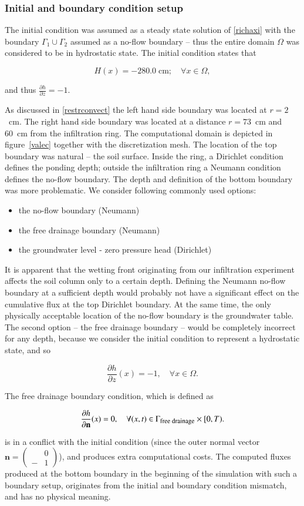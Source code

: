 \documentclass[review,times,3p,twocolumn,10pt]{elsarticle}
\newenvironment{lineq}
    {\begin{linenomath*}
    \begin{equation}
    }
    { 
    \end{equation} 
    \end{linenomath*}
    }
\renewcommand{\vec}{\mathbf}
\begin{document}
\subsubsection{Initial and boundary condition setup}



The initial condition was assumed as a steady state  solution  of \eqref{richaxi} with the boundary $\Gamma_1 \cup \Gamma_2$ assumed as a no-flow boundary -- thus the entire domain $\Omega$ was considered to be in hydrostatic state. The initial condition states that 
\begin{lineq}
	H(x) = -280.0 \; \mbox{cm}; \quad \forall x \in \Omega,
\end{lineq}
and thus $\frac{\partial h}{\partial z} = -1$.

As discussed in \ref{restrconvect} the left hand side boundary was located at $r=2$~cm. The right hand side boundary was located at a distance $r=73$~cm and 60~cm from the infiltration ring. The computational domain is depicted in figure~\ref{valec} together with the discretization mesh. The location of the top boundary was natural -- the soil surface. Inside the ring, a Dirichlet condition defines the ponding depth; outside the infiltration ring a Neumann condition defines the no-flow boundary. The depth and definition of the bottom boundary was more problematic. We consider following commonly used options:
\begin{itemize}
\item the no-flow boundary (Neumann)
\item the free drainage boundary (Neumann)
\item the groundwater level - zero pressure head (Dirichlet)
\end{itemize}
It is apparent that the wetting front originating from our infiltration experiment affects the soil column only to a certain depth. Defining the Neumann no-flow boundary at a sufficient depth would probably not have a significant effect on the cumulative flux at the top Dirichlet boundary. At the same time, the only physically acceptable location of the no-flow boundary is the groundwater table. The second option -- the free drainage boundary -- would be completely incorrect for any depth, because we consider the initial condition to represent a hydrostatic state, and so \begin{lineq} \frac{\partial h}{\partial z}(x) = -1, \quad \forall x \in \Omega .\end{lineq} The free drainage boundary condition, which is defined as
\begin{lineq}
\frac{\partial h}{\partial \vec{n}}(x) = 0, \quad \forall (x,t) \in \Gamma_{\mbox{\footnotesize free drainage}} \times [0,T).
\end{lineq}
is in a conflict with the initial condition (since the outer normal vector $\vec{n} = \left(\begin{smallmatrix} &0 \\ -&1 \end{smallmatrix} \right)$), and produces extra computational costs. The computed fluxes produced at the bottom boundary in the beginning of the simulation with such a boundary setup, originates from the initial and boundary condition mismatch, and has no physical meaning.
\end{document}
